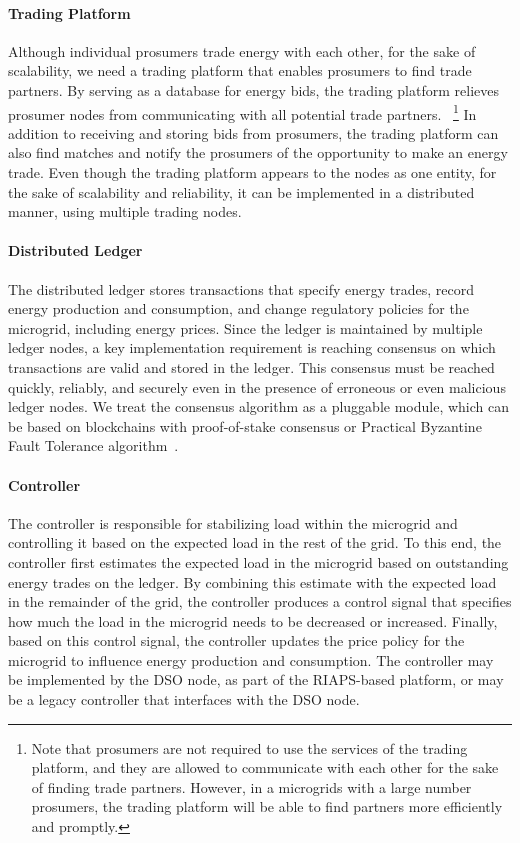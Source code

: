 \documentclass[chi_draft]{sigchi}
\begin{document}
\paragraph{Trading Platform}
Although individual prosumers trade energy with each other, for the sake of scalability, we need a trading platform that enables prosumers to find trade partners.
By serving as a database for energy bids, the trading platform relieves prosumer nodes from communicating with all potential trade partners.~%
\footnote{Note that prosumers are not required to use the services of the trading platform, and they are allowed to communicate with each other for the sake of finding trade partners.
However, in a microgrids with a large number prosumers, the trading platform will be able to find partners more efficiently and promptly.}
In addition to receiving and storing bids from prosumers, the trading platform can also find matches and notify the prosumers of the opportunity to make an energy trade.
Even though the trading platform appears to the nodes as one entity, for the sake of scalability and reliability, it can be implemented in a distributed manner, using multiple trading nodes.

\paragraph{Distributed Ledger}
The distributed ledger stores transactions that specify energy trades, record energy production and consumption, and change regulatory policies for the microgrid, including energy prices.
Since the ledger is maintained by multiple ledger nodes, a key implementation requirement is reaching consensus on which transactions are valid and stored in the ledger.
This consensus must be reached quickly, reliably, and securely even in the presence of erroneous or even malicious ledger nodes.
We treat the consensus algorithm as a pluggable module, which can be based on blockchains with proof-of-stake consensus or Practical Byzantine Fault Tolerance algorithm~\cite{castro1999practical}.

\paragraph{Controller}
The controller is responsible for stabilizing load within the microgrid and controlling it based on the expected load in the rest of the grid.
To this end, the controller first estimates the expected load in the microgrid based on outstanding energy trades on the ledger.
By combining this estimate with the expected load in the remainder of the grid, the controller produces a control signal that specifies how much the load in the microgrid needs to be decreased or increased.
Finally, based on this control signal, the controller updates the price policy for the microgrid to influence energy production and consumption.
The controller may be implemented by the DSO node, as part of the RIAPS-based platform, or may be a legacy controller that interfaces with the DSO node.
\end{document}
